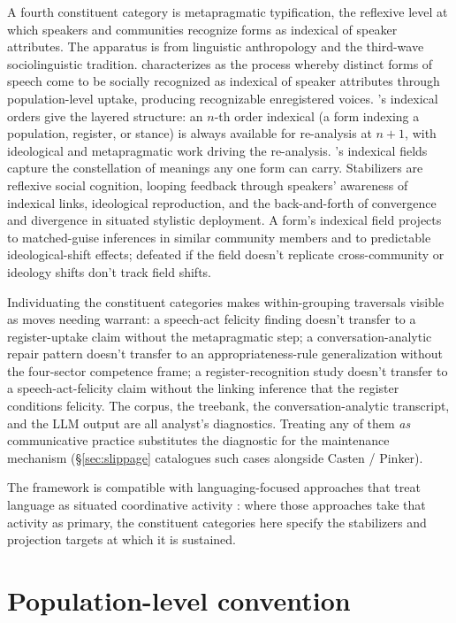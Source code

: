 \documentclass[12pt]{article}
\begin{document}
A fourth constituent category is metapragmatic typification, the reflexive level at which speakers and communities recognize forms as indexical of speaker attributes. The apparatus is from linguistic anthropology and the third-wave sociolinguistic tradition. \textcite{agha2005} characterizes  as the process whereby distinct forms of speech come to be socially recognized as indexical of speaker attributes through population-level uptake, producing recognizable enregistered voices. \textcite{silverstein2003indexical}'s indexical orders give the layered structure: an $n$-th order indexical (a form indexing a population, register, or stance) is always available for re-analysis at $n+1$, with ideological and metapragmatic work driving the re-analysis. \textcite{eckert2008indexical}'s indexical fields capture the constellation of meanings any one form can carry. Stabilizers are reflexive social cognition, looping feedback through speakers' awareness of indexical links, ideological reproduction, and the back-and-forth of convergence and divergence in situated stylistic deployment. A form's indexical field projects to matched-guise inferences in similar community members and to predictable ideological-shift effects; defeated if the field doesn't replicate cross-community or ideology shifts don't track field shifts.

Individuating the constituent categories makes within-grouping traversals visible as moves needing warrant: a speech-act felicity finding doesn't transfer to a register-uptake claim without the metapragmatic step; a conversation-analytic repair pattern doesn't transfer to an appropriateness-rule generalization without the four-sector competence frame; a register-recognition study doesn't transfer to a speech-act-felicity claim without the linking inference that the register conditions felicity. The corpus, the treebank, the conversation-analytic transcript, and the LLM output are all analyst's diagnostics. Treating any of them \emph{as} communicative practice substitutes the diagnostic for the maintenance mechanism (§\ref{sec:slippage} catalogues such cases alongside Casten / Pinker).

The framework is compatible with languaging-focused approaches that treat language as situated coordinative activity \citep{pennycook2010}: where those approaches take that activity as primary, the constituent categories here specify the stabilizers and projection targets at which it is sustained.

\section{Population-level convention}\label{sec:population}
\end{document}

